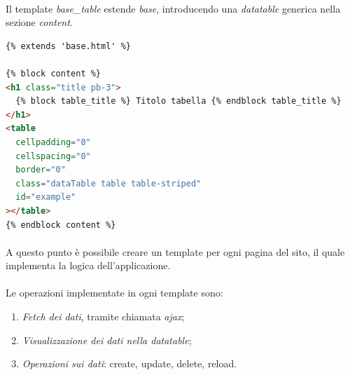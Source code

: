 \documentclass[11pt,a4paper,english]{article}
\begin{document}
\paragraph{} Il template \emph{base\_table} estende \emph{base}, introducendo una \emph{datatable} generica nella sezione \emph{content}. 

\begin{lstlisting}[language=html, caption=Template base\_table.html]
{% extends 'base.html' %} 

{% block content %}
<h1 class="title pb-3">
  {% block table_title %} Titolo tabella {% endblock table_title %}
</h1>
<table
  cellpadding="0"
  cellspacing="0"
  border="0"
  class="dataTable table table-striped"
  id="example"
></table>
{% endblock content %}

\end{lstlisting}

\paragraph{} A questo punto è possibile creare un template per ogni pagina del sito, il quale implementa la logica dell'applicazione. 

\paragraph{} Le operazioni implementate in ogni template sono:\begin{enumerate}
    \item \emph{Fetch dei dati}, tramite chiamata \emph{ajax};
    \item \emph{Visualizzazione dei dati nella datatable};
    \item \emph{Operazioni sui dati}: create, update, delete, reload.  
\end{enumerate}
\end{document}
